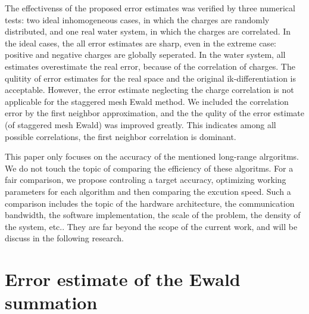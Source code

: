\documentclass[aps,pre,preprint]{revtex4}
\begin{document}
The effectivenss of the proposed error estimates was verified by
three numerical tests: two ideal inhomogeneous cases, in which the charges
are randomly distributed,
and one real water system, in which the charges are correlated.
In the ideal cases, the all error estimates are sharp, even in the extreme
case: positive and negative charges are globally seperated. 
In the water system,  all estimates overestimate the real error,
because of the correlation of charges.
The qulitity of  error estimates for the
real space  and the original ik-differentiation is acceptable.
However, the error estimate neglecting the charge correlation
is not applicable  for the staggered mesh Ewald method.
We included the correlation error by the first neighbor approximation,
and the 
the qulity of the
error estimate (of staggered mesh Ewald) was improved greatly.
This indicates among all possible correlations, the first
neighbor correlation is dominant.

This paper only focuses on the accuracy of the
mentioned long-range alrgoritms.
We do not touch the topic of comparing the efficiency of these algoritms.
For a fair comparison, we propose controling a target accuracy,
optimizing working parameters for each algorithm and then comparing
the excution speed.
Such a comparison includes the topic of the hardware architecture,
the communication bandwidth,
the software implementation, the scale of the problem,
the density of the system, etc.. They are far beyond the scope of the current
work, and will be discuss in the following research.




\newpage
\appendix
\section{Error estimate of the Ewald summation}
\label{sec:appendix}



\newpage

{}

\end{document}
